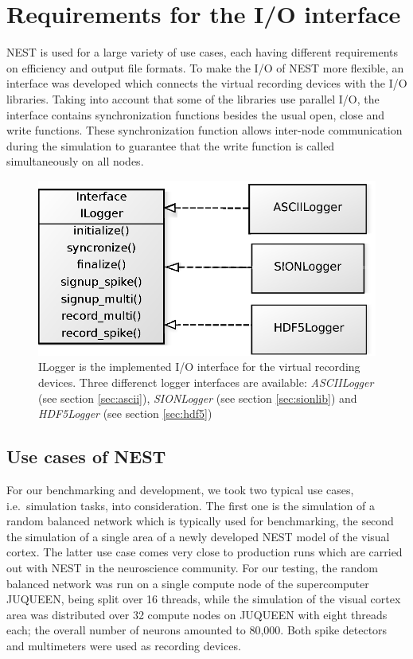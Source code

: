 \documentclass[]{YIC2015}
\begin{document}
\section{Requirements for the I/O interface}

NEST is used for a large variety of use cases, each having different
requirements on efficiency and output file formats. To make the I/O of
NEST more flexible, an interface was developed which connects the
virtual recording devices with the I/O libraries. Taking into account that some
of the libraries use parallel I/O, the interface contains
synchronization functions besides the usual open, close and write
functions. These synchronization function allows inter-node
communication during the simulation to guarantee that the write
function is called simultaneously on all nodes.

\begin{figure}[htbp]
\centering %
\includegraphics[scale=0.5]{loggerinterface.eps}
\caption{ILogger is the implemented I/O interface for the virtual recording devices.
Three differenct logger interfaces are available: \emph{ASCIILogger} (see section \ref{sec:ascii}),
\emph{SIONLogger} (see section \ref{sec:sionlib}) and \emph{HDF5Logger} (see section \ref{sec:hdf5})}
\label{fig:loggerinterface}
\end{figure}

\subsection{Use cases of NEST}

For our benchmarking and development, we took two typical use cases,
i.e.~simulation tasks, into consideration. The first one is the simulation of a
random balanced network \cite{morrison07} which is typically used for
benchmarking, the second the simulation of a single area of a newly developed
NEST model of the visual cortex. The latter use case comes very close to
production runs which are carried out with NEST in the neuroscience community.
For our testing, the random balanced network was run on a single compute node of
the supercomputer JUQUEEN, being split over 16 threads, while the simulation of
the visual cortex area was distributed over 32 compute nodes on JUQUEEN with
eight threads each; the overall number of neurons amounted to 80,000. Both spike
detectors and multimeters were used as recording devices.
\end{document}
